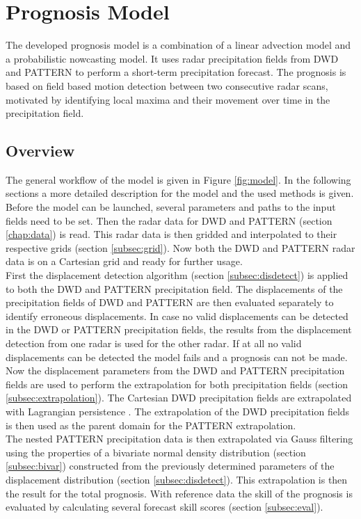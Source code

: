 \documentclass[11pt,twoside,a4paper,fleqn,x11names]{report}
\numberwithin{equation}{chapter}
\numberwithin{figure}{chapter}
\numberwithin{table}{chapter}
\begin{document}
\chapter{Prognosis Model}
The developed prognosis model is a combination of a linear advection model and a probabilistic nowcasting model. It uses radar precipitation fields from DWD and PATTERN to perform a short-term precipitation forecast. The prognosis is based on field based motion detection between two consecutive radar scans, motivated by identifying local maxima and their movement over time in the precipitation field.
\section{Overview}
The general workflow of the model is given in Figure \ref{fig:model}. In the following sections a more detailed description for the model and the used methods is given. Before the model can be launched, several parameters and paths to the input fields need to be set. %
Then the radar data for DWD and PATTERN (section \ref{chap:data}) is read. This radar data is then gridded and interpolated to their respective grids (section \ref{subsec:grid}). Now both the DWD and PATTERN radar data is on a Cartesian grid and ready for further usage. \\
First the displacement detection algorithm (section \ref{subsec:disdetect}) is applied to both the DWD and PATTERN precipitation field. The displacements of the precipitation fields of DWD and PATTERN are then evaluated separately to identify erroneous displacements. In case no valid displacements can be detected in the DWD or PATTERN precipitation fields, the results from the displacement detection from one radar is used for the other radar. If at all no valid displacements can be detected the model fails and a prognosis can not be made. \\
Now the displacement parameters from the DWD and PATTERN precipitation fields are used to perform the extrapolation for both precipitation fields (section \ref{subsec:extrapolation}). The Cartesian DWD precipitation fields are extrapolated with Lagrangian persistence \citep{Germann}. The extrapolation of the DWD precipitation fields is then used as the parent domain for the PATTERN extrapolation. \\
The nested PATTERN precipitation data is then extrapolated via Gauss filtering using the properties of a bivariate normal density distribution (section \ref{subsec:bivar}) constructed from the previously determined parameters of the displacement distribution (section \ref{subsec:disdetect}). This extrapolation is then the result for the total prognosis. With reference data the skill of the prognosis is evaluated by calculating several forecast skill scores (section \ref{subsec:eval}).
\end{document}
